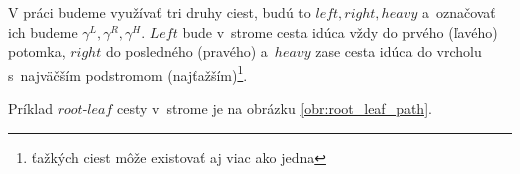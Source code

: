 V práci budeme využívať tri druhy ciest, budú to $left, right, heavy$ a~označovať ich
budeme $\gamma^L, \gamma^R, \gamma^H$. $Left$ bude v~strome cesta idúca vždy do prvého (ľavého)
potomka, $right$ do posledného (pravého) a~$heavy$ zase cesta idúca do vrcholu s~najväčším
podstromom (najťažším)\footnote{ťažkých ciest môže existovať aj viac ako jedna}.

Príklad $root$-$leaf$ cesty v~strome je na obrázku \ref{obr:root_leaf_path}.



